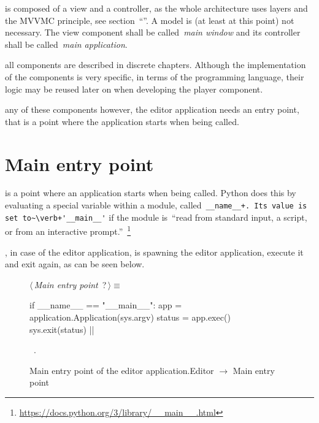 \documentclass[%
    a4paper,    %
    justified,  %
    nobib,      %
    openany     %
]{tufte-book}
\begin{document}
 is composed of a view and a controller, as the
whole architecture uses layers and the MVVMC principle, see
section~\enquote{}. A model is (at least at this point) not
necessary. The view component shall be called~\emph{main window} and its
controller shall be called~\emph{main application}.

 all components are described in discrete
chapters. Although the implementation of the components is very specific, in
terms of the programming language, their logic may be reused later on when
developing the player component.

 any of these components however, the editor
application needs an entry point, that is a point where the application starts
when being called.

\section{Main entry point}
\label{appendix:sec:editor:main}

 is a point where an application starts when being
called. Python does this by evaluating a special variable within a module,
called~\verb=__name__+. Its value is set to~\verb+'__main__'= if the module
is~\enquote{read from standard input, a script, or from an interactive
prompt.}~\footnote{\url{https://docs.python.org/3/library/__main__.html}}

, in case of the editor
application, is spawning the editor application, execute it and exit again, as
can be seen below.

\begin{figure}[h]
  \begin{flushleft} \small
\begin{minipage}{\linewidth}\label{scrap11}\raggedright\small
{} $\langle\,${\itshape Main entry point}\nobreak\ {\footnotesize {?}}$\,\rangle\equiv$
\vspace{-1ex}
\begin{pythoncode}
if __name__ == "__main__":
    app = application.Application(sys.argv)
    status = app.exec()
    sys.exit(status)
  |\NWsep|
\end{pythoncode}
\vspace{1.5ex}
\footnotesize
\begin{list}{}{\setlength{\itemsep}{-\parsep}\setlength{\itemindent}{-\leftmargin}}
\item \NWtxtMacroRefIn\ .

\item{}
\end{list}
\end{minipage}\vspace{4ex}
\end{flushleft}
\caption{Main entry point of the editor application.\newline{}\newline{}Editor
    $\rightarrow$ Main entry point}
  \label{editor:lst:main}
\end{figure}
\end{document}
